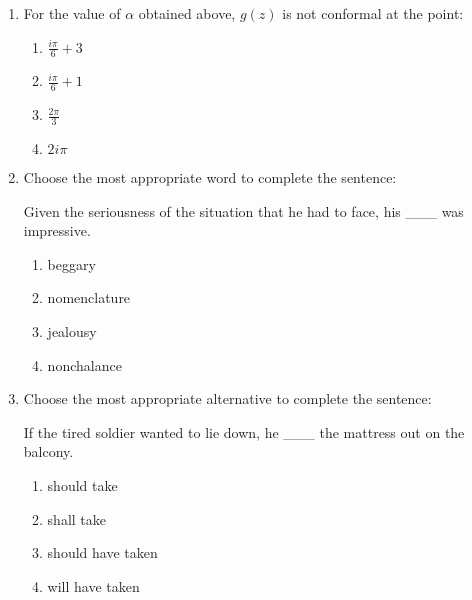 \documentclass[journal]{IEEEtran}
\numberwithin{equation}{enumi}
\numberwithin{figure}{enumi}
\begin{document}
\begin{enumerate}
the residue of $f(z)$ at its pole equals 1, then the value of $\alpha$ is:

\hfill{}
\begin{multicols}{4}
\begin{enumerate}
\item $-1$
\item $1$
\item $2$
\item $3$
\end{enumerate}
\end{multicols}

\item
For the value of $\alpha$ obtained above, $g(z)$ is not conformal at the point:

\hfill{}
\begin{multicols}{4}
\begin{enumerate}
\item $\frac{i \pi}{6} + 3$
\item $\frac{i \pi}{6} + 1$
\item $\frac{2\pi}{3}$
\item $2 i \pi$
\end{enumerate}
\end{multicols}

\item
Choose the most appropriate word to complete the sentence:

Given the seriousness of the situation that he had to face, his \_\_\_ was impressive.

\hfill{}
\begin{multicols}{2}
\begin{enumerate}
\item beggary
\item nomenclature
\item jealousy
\item nonchalance
\end{enumerate}
\end{multicols}

\item
Choose the most appropriate alternative to complete the sentence:

If the tired soldier wanted to lie down, he \_\_\_ the mattress out on the balcony.

\hfill{}
\begin{multicols}{2}
\begin{enumerate}
\item should take
\item shall take
\item should have taken
\item will have taken
\end{enumerate}
\end{multicols}


\end{enumerate}
\end{document}
